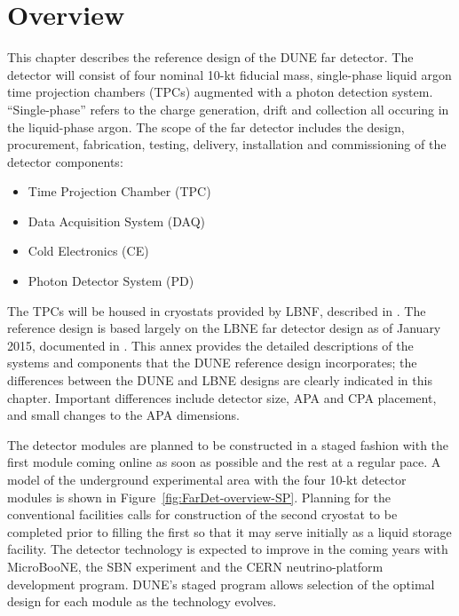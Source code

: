 \section{Overview}
\label{sec:detectors-fd-ref-ov}


This chapter describes the reference design of the DUNE far detector.  The detector will consist of four nominal 10-kt fiducial mass, single-phase liquid argon time projection chambers (TPCs) augmented with a photon detection system.  ``Single-phase'' refers to the charge generation, drift and collection all occuring in the liquid-phase argon. The scope of the far detector includes the design, procurement, fabrication, testing, delivery, installation and commissioning of the detector components: 

\begin{itemize}
\item Time Projection Chamber (TPC)
\item Data Acquisition System (DAQ)  
\item Cold Electronics (CE)
\item Photon Detector System (PD)
\end{itemize}
The TPCs will be housed in cryostats provided by LBNF, described in \vollbnf. The reference design is based largely on the LBNE far detector design as of January 2015, documented in \anxlbnefd. This annex provides the detailed descriptions of the systems and components that the DUNE reference design incorporates; the differences between the DUNE and LBNE designs are clearly indicated in this chapter. Important differences include detector size, APA and CPA placement, and small changes to the APA dimensions.


The detector modules are planned to be constructed in a staged fashion with the first module coming online as soon as possible and the rest at a regular pace. A model of the underground experimental area with the four 10-kt detector modules is shown in Figure~\ref{fig:FarDet-overview-SP}. Planning for the conventional facilities calls for construction of the second cryostat to be completed prior to filling the first so that it may serve initially as a liquid storage facility. 
The detector technology is expected to improve in the coming years with MicroBooNE, the SBN experiment and the CERN neutrino-platform development program. DUNE's staged program allows selection of the optimal design for each module as the technology evolves.  %

